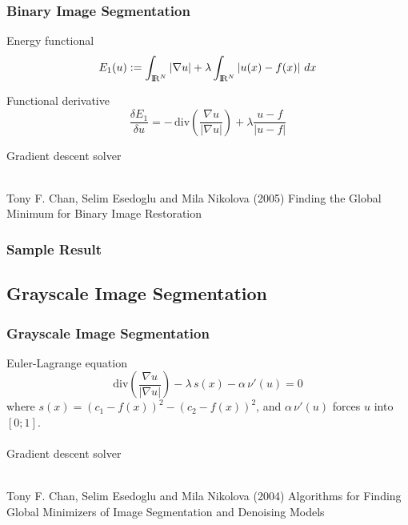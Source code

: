 \documentclass{beamer}
\begin{document}
\begin{frame}
  \frametitle{Binary Image Segmentation}

  Energy functional
  \begin{equation*}
    E_1(u) := \int_{{\rm I\!R}^N} \left| \nabla u \right|
    + \lambda \int_{{\rm I\!R}^N} \left| u(x) - f(x) \right| \, dx
  \end{equation*}

  Functional derivative
  \begin{equation*}
    \frac{\delta E_1}{\delta u} = - \, \mathrm{div} \left( {\frac{\nabla u}{| \nabla u |}} \right)
    + \lambda \frac{u - f}{|u - f|}
  \end{equation*}

  Gradient descent solver \\~\\

  \begin{thebibliography}{99}
  \bibitem[Chan, 2005]{} Tony F. Chan, Selim Esedoglu and Mila Nikolova (2005)
    \newblock Finding the Global Minimum for Binary Image Restoration
  \end{thebibliography}
\end{frame}

\begin{frame}
  \frametitle{Sample Result}

\end{frame}

\subsection{Grayscale Image Segmentation}

\begin{frame}
  \frametitle{Grayscale Image Segmentation}

  Euler-Lagrange equation
  \begin{equation*}
    \mathrm{div} \left( {\frac{\nabla u}{| \nabla u |}} \right)
    - \lambda \, s(x) - \alpha \, \nu'(u) = 0
  \end{equation*}
  where $ s(x) = (c_1 - f(x))^2 - (c_2 - f(x))^2 $, and $ \alpha \, \nu'(u) $ forces $ u $ into $ [0; 1] $.
  \\~\\
  Gradient descent solver
  \\~\\
  \begin{thebibliography}{99}
  \bibitem[Chan, 2004]{} Tony F. Chan, Selim Esedoglu and Mila Nikolova (2004)
    \newblock Algorithms for Finding Global Minimizers of Image Segmentation and Denoising Models
  \end{thebibliography}
\end{frame}
\end{document}
